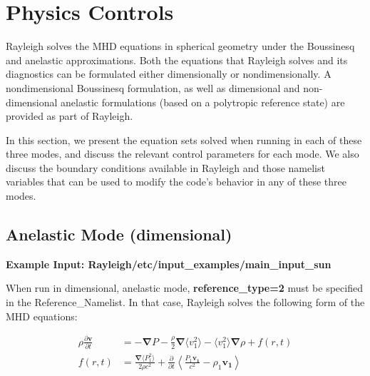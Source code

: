 \clearpage
\section{Physics Controls}\label{sec:physics}
Rayleigh solves the MHD equations in spherical geometry under the Boussinesq and anelastic approximations.  Both the equations that Rayleigh solves and its diagnostics can be formulated either dimensionally or nondimensionally.  A nondimensional Boussinesq formulation, as well as dimensional and non-dimensional anelastic formulations (based on a polytropic reference state) are provided as part of Rayleigh.

In this section, we present the equation sets solved when running in each of these three modes, and discuss the relevant control parameters for each mode.   We also discuss the boundary conditions available in Rayleigh and those namelist variables that can be used to modify the code's behavior in any of these three modes.

\subsection{Anelastic Mode (dimensional)}

\textbf{Example Input:  Rayleigh/etc/input\_examples/main\_input\_sun}

When run in dimensional, anelastic mode, \textbf{reference\_type=2} must be specified in the Reference\_Namelist.  In that case, Rayleigh solves the following form of the MHD equations:

\begin{align*}
\rho\frac{ \partial \boldsymbol{v} }{\partial t}  &=    -\boldsymbol{\nabla}P  %
						        - \frac{\rho}{2}\boldsymbol{\nabla}\langle v_1^2\rangle
							- \langle v_1^2\rangle\boldsymbol{\nabla}\rho
							+ f(r,t) \\
f(r,t) &= \frac{\boldsymbol{\nabla}\langle P_1^2 \rangle}{2\rho c^2}+\frac{\partial}{\partial t}\left\langle \frac{P_1\boldsymbol{v_1}}{c^2} -\rho_1 \boldsymbol{v_1} \right\rangle
\end{align*}


